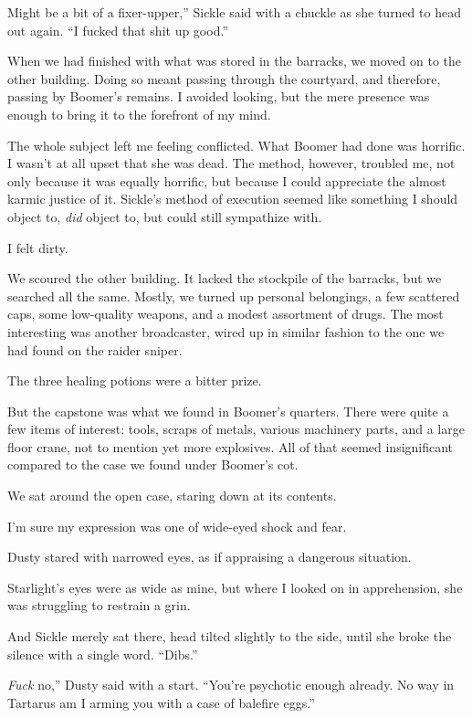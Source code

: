 \leavevmode{}Might be a bit of a fixer-upper,” Sickle said with a chuckle as she turned to head out again. “I fucked that shit up good.”

When we had finished with what was stored in the barracks, we moved on to the other building. Doing so meant passing through the courtyard, and therefore, passing by Boomer’s remains. I avoided looking, but the mere presence was enough to bring it to the forefront of my mind.

The whole subject left me feeling conflicted. What Boomer had done was horrific. I wasn’t at all upset that she was dead. The method, however, troubled me, not only because it was equally horrific, but because I could appreciate the almost karmic justice of it. Sickle’s method of execution seemed like something I should object to, \textit{did} object to, but could still sympathize with.

I felt dirty.

We scoured the other building. It lacked the stockpile of the barracks, but we searched all the same. Mostly, we turned up personal belongings, a few scattered caps, some low-quality weapons, and a modest assortment of drugs. The most interesting was another broadcaster, wired up in similar fashion to the one we had found on the raider sniper.

The three healing potions were a bitter prize.

But the capstone was what we found in Boomer’s quarters. There were quite a few items of interest: tools, scraps of metals, various machinery parts, and a large floor crane, not to mention yet more explosives. All of that seemed insignificant compared to the case we found under Boomer’s cot.

We sat around the open case, staring down at its contents.

I’m sure my expression was one of wide-eyed shock and fear.

Dusty stared with narrowed eyes, as if appraising a dangerous situation.

Starlight’s eyes were as wide as mine, but where I looked on in apprehension, she was struggling to restrain a grin.

And Sickle merely sat there, head tilted slightly to the side, until she broke the silence with a single word. “Dibs.”

\leavevmode{}\textit{Fuck} no,” Dusty said with a start. “You’re psychotic enough already. No way in Tartarus am I arming you with a case of balefire eggs.”

